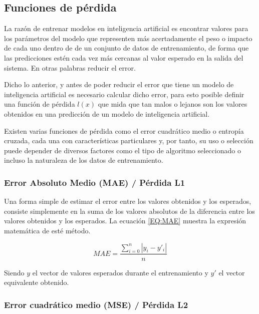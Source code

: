     \subsection{Funciones de pérdida}
        \label{sub:FrameLossFunction}
        
        La razón de entrenar modelos en inteligencia artificial es encontrar valores para los parámetros del modelo que representen más acertadamente el peso o impacto de cada uno dentro de de un conjunto de datos de entrenamiento, de forma que las predicciones estén cada vez más cercanas al valor esperado en la salida del sistema. En otras palabras reducir el error.
        
        Dicho lo anterior, y antes de poder reducir el error que tiene un modelo de inteligencia artificial es necesario calcular dicho error, para esto posible definir una función de pérdida $l(x)$ que mida que tan malos o lejanos son los valores obtenidos en una predicción de un modelo de inteligencia artificial. 
        
        Existen varias funciones de pérdida como el error cuadrático medio  o entropía cruzada, cada una con características particulares y, por tanto, su uso o selección puede depender de diversos factores como el tipo de algoritmo seleccionado o incluso la naturaleza de los datos de entrenamiento.
        
        \subsubsection{Error Absoluto Medio (MAE) / Pérdida L1}
        \label{sub2:FrameMAE}
            
            Una forma simple de estimar el error entre los valores obtenidos y los esperados, consiste simplemente en la suma de los valores absolutos de la diferencia entre los valores obtenidos y los esperados. La ecuación \ref{EQ:MAE} muestra la expresión matemática de esté método.
            
            \begin{equation}
            	\label{EQ:MAE}
            	MAE = \frac{ \sum_{i=0}^{n} \left | y_i - y'_i \right |}{n}
            \end{equation}
            
            Siendo $y$ el vector de valores esperados durante el entrenamiento y $y'$ el vector equivalente obtenido.
            
        \subsubsection{Error cuadrático medio (MSE) / Pérdida L2}
        \label{sub2:FrameMSE}
            
